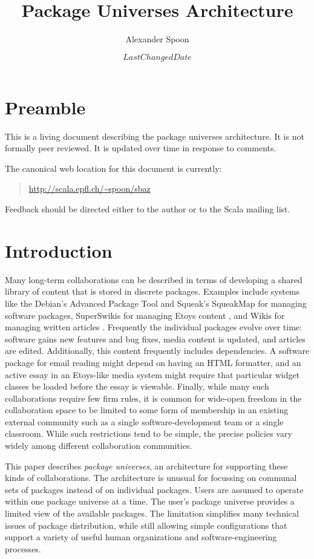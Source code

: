 \documentclass{article}
\begin{document}

\title{Package Universes Architecture}
\author{Alexander Spoon}
\date{$LastChangedDate$}
\maketitle

\section{Preamble}
This is a living document describing the package universes
architecture.  It is not formally peer reviewed.  It is updated over
time in response to comments.

The canonical web location for this document is currently:
\begin{quote}
  \url{http://scala.epfl.ch/~spoon/sbaz}
\end{quote}
Feedback should be directed either to the author or to the Scala
mailing list.


\section{Introduction}
Many long-term collaborations can be described in terms of developing
a shared library of content that is stored in discrete packages.  
Examples include systems like the Debian's Advanced Package Tool and
Squeak's SqueakMap for managing software packages, SuperSwikis for
managing Etoys content \cite{steinmetz02:learning}, and Wikis for
managing written articles \cite{ward01:wikiway}.  Frequently the
individual packages evolve over time: software gains new
features and bug fixes, media content is updated, and articles are
edited.  Additionally, this content frequently includes dependencies.
A software package for email reading might depend on having an HTML
formatter, and an active essay in an Etoys-like media system might
require that particular widget classes be loaded before the essay is
viewable.  Finally, while many such collaborations require few firm
rules, it is common for wide-open freedom in the collaboration space
to be limited to some form of membership in an existing external
community such as a single software-development team or a single
classroom.  While such restrictions tend to be simple, the precise
policies vary widely among different collaboration communities.


This paper describes \emph{package universes}, an architecture for
supporting these kinds of collaborations.  The architecture is unusual
for focussing on communal sets of packages instead of on individual
packages.  Users are assumed to operate within one package universe at
a time.  The user's package universe provides a limited view of the
available packages.  The limitation simplifies many technical issues
of package distribution, while still allowing simple configurations
that support a variety of useful human organizations and
software-engineering processes.
\end{document}
